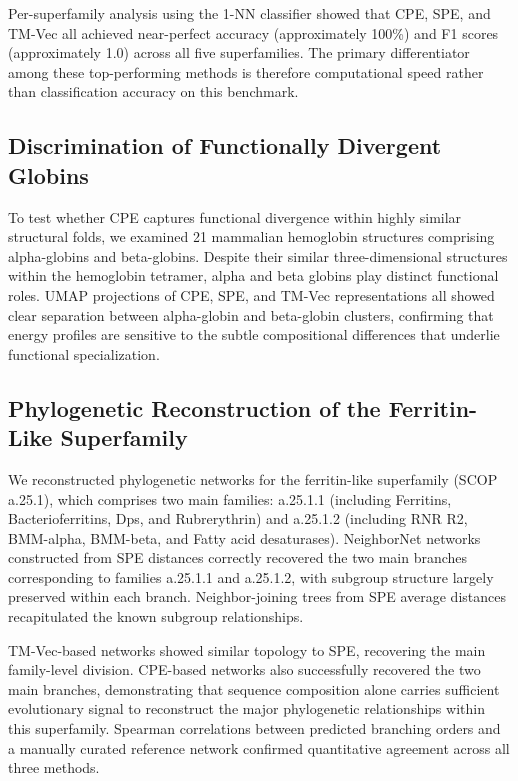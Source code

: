 \documentclass[11pt]{article}
\begin{document}
Per-superfamily analysis using the 1-NN classifier showed that CPE, SPE, and TM-Vec all achieved near-perfect accuracy (approximately 100\%) and F1 scores (approximately 1.0) across all five superfamilies. The primary differentiator among these top-performing methods is therefore computational speed rather than classification accuracy on this benchmark.

\subsection{Discrimination of Functionally Divergent Globins}

To test whether CPE captures functional divergence within highly similar structural folds, we examined 21 mammalian hemoglobin structures comprising alpha-globins and beta-globins. Despite their similar three-dimensional structures within the hemoglobin tetramer, alpha and beta globins play distinct functional roles. UMAP projections of CPE, SPE, and TM-Vec representations all showed clear separation between alpha-globin and beta-globin clusters, confirming that energy profiles are sensitive to the subtle compositional differences that underlie functional specialization.

\subsection{Phylogenetic Reconstruction of the Ferritin-Like Superfamily}

We reconstructed phylogenetic networks for the ferritin-like superfamily (SCOP a.25.1), which comprises two main families: a.25.1.1 (including Ferritins, Bacterioferritins, Dps, and Rubrerythrin) and a.25.1.2 (including RNR R2, BMM-alpha, BMM-beta, and Fatty acid desaturases). NeighborNet networks constructed from SPE distances correctly recovered the two main branches corresponding to families a.25.1.1 and a.25.1.2, with subgroup structure largely preserved within each branch. Neighbor-joining trees from SPE average distances recapitulated the known subgroup relationships.

TM-Vec-based networks showed similar topology to SPE, recovering the main family-level division. CPE-based networks also successfully recovered the two main branches, demonstrating that sequence composition alone carries sufficient evolutionary signal to reconstruct the major phylogenetic relationships within this superfamily. Spearman correlations between predicted branching orders and a manually curated reference network confirmed quantitative agreement across all three methods.
\end{document}
